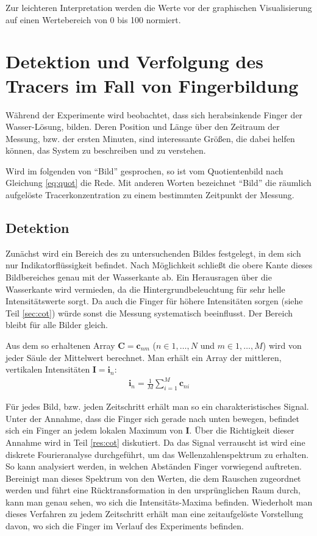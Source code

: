 Zur leichteren Interpretation werden die Werte vor der graphischen Visualisierung auf einen Wertebereich von 0 bis 100 normiert.

\section{Detektion und Verfolgung des Tracers im Fall von Fingerbildung}
\label{sec:track}
Während der \COTm Experimente wird beobachtet, dass sich herabsinkende Finger der Wasser-\COTm Lösung, bilden. Deren Position und Länge über den Zeitraum der 
Messung, bzw. der ersten Minuten, sind interessante Größen, die dabei helfen können, das System zu beschreiben und zu verstehen.

Wird im folgenden von ``Bild'' gesprochen, so ist vom Quotientenbild nach Gleichung \ref{eq:quot} die Rede. Mit anderen Worten bezeichnet ``Bild'' die räumlich 
aufgelöste Tracerkonzentration zu einem bestimmten Zeitpunkt der Messung.

\subsection{Detektion}
\label{sec:dec}
Zunächst wird ein Bereich des zu untersuchenden Bildes festgelegt, in dem sich nur Indikatorflüssigkeit befindet. Nach Möglichkeit schließt die obere Kante 
dieses Bildbereiches genau mit der Wasserkante ab. Ein Herausragen über die Wasserkante wird vermieden, da die Hintergrundbeleuchtung für sehr helle 
Intensitätswerte sorgt. Da auch die Finger für höhere Intensitäten sorgen (siehe Teil \ref{sec:cot}) würde sonst die Messung systematisch beeinflusst. Der 
Bereich bleibt für alle Bilder gleich.

Aus dem so erhaltenen Array $\mathbf{C} = \mathbf{c}_{nm}$ ($n \in 1,\dots,N$ und $m \in 1,\dots,M$) wird von jeder Säule der Mittelwert berechnet. Man erhält 
ein Array der mittleren, vertikalen Intensitäten $\mathbf{I} = \mathbf{i}_{n}$:
\begin{eqnarray}
 \mathbf{i}_{n} = \frac{1}{M} \sum_{i=1}^{M} \mathbf{c}_{ni}
\end{eqnarray}

Für jedes Bild, bzw. jeden Zeitschritt erhält man so ein charakteristisches Signal. Unter der Annahme, dass die Finger sich gerade nach unten bewegen, befindet 
sich ein Finger an jedem lokalen Maximum von $\mathbf{I}$. Über die Richtigkeit dieser Annahme wird in Teil \ref{res:cot} diskutiert.
Da das Signal verrauscht ist wird eine diskrete Fourieranalyse durchgeführt, um das Wellenzahlenspektrum zu erhalten. So kann analysiert werden, in welchen 
Abständen Finger vorwiegend auftreten. Bereinigt man dieses Spektrum von den Werten, die dem Rauschen zugeordnet werden und führt eine Rücktransformation in den 
ursprünglichen Raum durch, kann man genau sehen, wo sich die Intensitäts-Maxima befinden. Wiederholt man dieses Verfahren zu jedem Zeitschritt erhält man eine 
zeitaufgelöste Vorstellung davon, wo sich die Finger im Verlauf des Experiments befinden.

